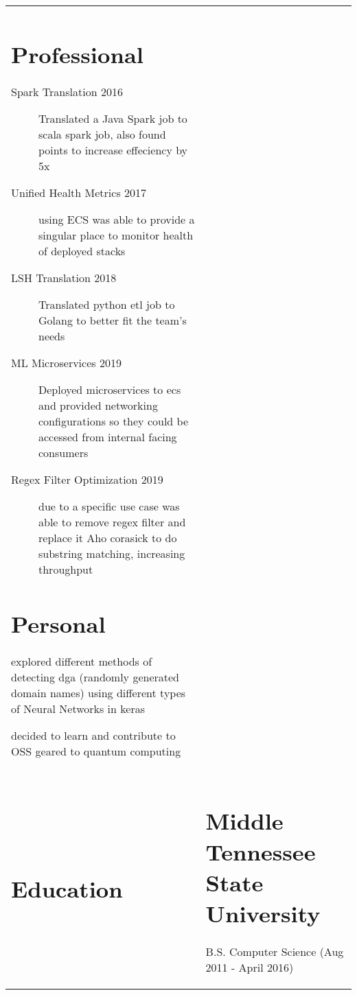 \documentclass[10pt]{article}
\begin{document}
\begin{tabularx}{\textwidth}{p{3cm} X}
\section*{Professional}
\begin{description}
    \item [Spark Translation 2016] Translated a Java Spark job to scala spark job, also found points to increase effeciency by 5x
    \item [Unified Health Metrics 2017] using ECS was able to provide a singular place to monitor health of deployed stacks
    \item [LSH Translation 2018] Translated python etl job to Golang to better fit the team's needs
    \item [ML Microservices 2019] Deployed microservices to ecs and provided networking configurations so they could be accessed from internal facing consumers
    \item [Regex Filter Optimization 2019] due to a specific use case was able to remove regex filter and replace it Aho corasick to do substring matching, 
    increasing throughput
\end{description}
\section*{Personal}
\begin{description}
    \setlength{\itemsep}{1pt}
    \item [DGA detection 2018] explored different methods of detecting dga (randomly generated domain names) using different types of Neural Networks in keras
    \item [Qiskit current] decided to learn and contribute to OSS geared to quantum computing
\end{description} \\
\section*{Education} & \section*{Middle Tennessee State University}
B.S. Computer Science (Aug 2011 - April 2016)
\end{tabularx}
\end{document}
